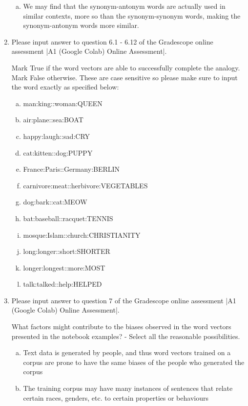 \begin{enumerate}[1.]
\begin{enumerate}[a.]
\item We may find that the synonym-antonym words are actually used in similar contexts, more so than the synonym-synonym words, making the synonym-antonym words more similar.
\end{enumerate}


\item {}

Please input answer to question 6.1 - 6.12 of the Gradescope online assessment |A1 (Google Colab) Online Assessment|.

Mark True if the word vectors are able to successfully complete the analogy. Mark False otherwise. These are case sensitive so please make sure to input the word exactly as specified below:

\begin{enumerate}[a.]
\item \textsf{man:king::woman:QUEEN}
\item \textsf{air:plane::sea:BOAT}
\item \textsf{happy:laugh::sad:CRY} %
\item \textsf{cat:kitten::dog:PUPPY}
\item \textsf{France:Paris::Germany:BERLIN}
\item \textsf{carnivore:meat::herbivore:VEGETABLES} %
\item \textsf{dog:bark::cat:MEOW} %
\item \textsf{bat:baseball::racquet:TENNIS}
\item \textsf{mosque:Islam::church:CHRISTIANITY}
\item \textsf{long:longer::short:SHORTER}
\item \textsf{longer:longest::more:MOST}
\item \textsf{talk:talked::help:HELPED}
\end{enumerate}


\item {}

Please input answer to question 7 of the Gradescope online assessment |A1 (Google Colab) Online Assessment|.

What factors might contribute to the biases observed in the word vectors presented in the notebook examples? - Select all the reasonable possibilities.

\begin{enumerate}[a.]
\item Text data is generated by people, and thus word vectors trained on a corpus are prone to have the same biases of the people who generated the corpus 
\item The training corpus may have many instances of sentences that relate certain races, genders, etc. to certain properties or behaviours
\end{enumerate}


\end{enumerate}
